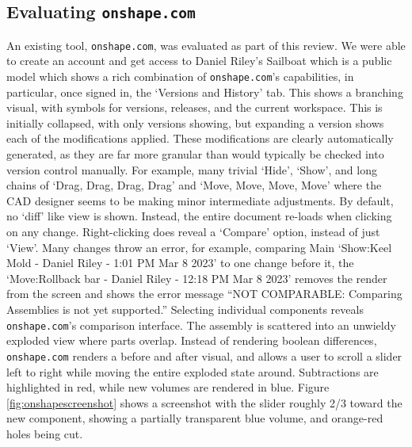 \documentclass[sigconf,authorversion,nonacm]{acmart}
\begin{document}
\subsection{Evaluating \texttt{onshape.com}}

An existing tool, \texttt{onshape.com}, was evaluated as part of this review.
We were able to create an account and get access to Daniel Riley's Sailboat
which is a public model which shows a rich combination of \texttt{onshape.com}'s capabilities, in particular, once signed in, the `Versions and History' tab.
This shows a branching visual, with symbols for versions, releases, and the current workspace.
This is initially collapsed, with only versions showing, but expanding a version shows each of the modifications applied.
These modifications are clearly automatically generated, as they are far more granular than would typically be checked into version control manually.
For example, many trivial `Hide', `Show', and long chains of `Drag, Drag, Drag, Drag' and `Move, Move, Move, Move' where the CAD designer seems to be making minor intermediate adjustments.
By default, no `diff' like view is shown.
Instead, the entire document re-loads when clicking on any change.
Right-clicking does reveal a `Compare' option, instead of just `View'.
Many changes throw an error, for example, comparing Main `Show:Keel Mold - Daniel Riley - 1:01 PM Mar 8 2023' to one change before it, the `Move:Rollback bar - Daniel Riley - 12:18 PM Mar 8 2023' removes the render from the screen and shows the error message ``NOT COMPARABLE: Comparing Assemblies is not yet supported.''
Selecting individual components reveals \texttt{onshape.com}'s comparison interface.
The assembly is scattered into an unwieldy exploded view where parts overlap.
Instead of rendering boolean differences, \texttt{onshape.com} renders a before and after visual, and allows a user to scroll a slider left to right while moving the entire exploded state around.
Subtractions are highlighted in red, while new volumes are rendered in blue.
Figure \ref{fig:onshapescreenshot} shows a screenshot with the slider roughly 2/3 toward the new component, showing a partially transparent blue volume, and orange-red holes being cut.
\end{document}

